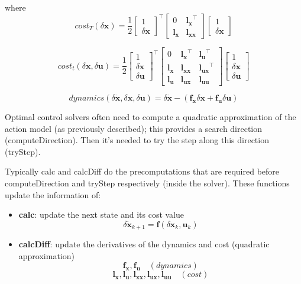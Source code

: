 where
$$cost_T(\delta\mathbf{x}) = \frac{1}{2}
\begin{bmatrix} 
  1 \\ \delta\mathbf{x}
\end{bmatrix}^\top
\begin{bmatrix}
0 & \mathbf{l_x}^\top \\
\mathbf{l_x} & \mathbf{l_{xx}}
\end{bmatrix}
\begin{bmatrix}
  1 \\ \delta\mathbf{x}
\end{bmatrix}
$$

$$cost_t(\delta\mathbf{x},\delta\mathbf{u}) = \frac{1}{2}
\begin{bmatrix} 
  1 \\ \delta\mathbf{x} \\ \delta\mathbf{u}
\end{bmatrix}^\top
\begin{bmatrix}
0 & \mathbf{l_x}^\top & \mathbf{l_u}^\top\\
\mathbf{l_x} & \mathbf{l_{xx}} & \mathbf{l_{ux}}^\top\\
\mathbf{l_u} & \mathbf{l_{ux}} & \mathbf{l_{uu}}
\end{bmatrix}
\begin{bmatrix}
  1 \\ \delta\mathbf{x} \\ \delta\mathbf{u}
\end{bmatrix}
$$

$$
dynamics(\delta\mathbf{\dot{x}},\delta\mathbf{x},\delta\mathbf{u}) = \delta\mathbf{\dot{x}} - (\mathbf{f_x}\delta\mathbf{x} + \mathbf{f_u}\delta\mathbf{u})
$$

Optimal control solvers often need to compute a quadratic approximation of the action model (as previously described); this provides a search direction (computeDirection). Then it's needed to try the step along this direction (tryStep).

Typically calc and calcDiff do the precomputations that are required before computeDirection and tryStep respectively (inside the solver). These functions update the information of:
\begin{itemize}
\item \textbf{calc}: update the next state and its cost value
 $$\delta\mathbf{\dot{x}}_{k+1} = \mathbf{f}(\delta\mathbf{x}_k,\mathbf{u}_k)$$
\item \textbf{calcDiff}: update the derivatives of the dynamics and cost (quadratic approximation)
 $$\mathbf{f_x}, \mathbf{f_u} \hspace{1em} (dynamics)$$
 $$\mathbf{l_x}, \mathbf{l_u}, \mathbf{l_{xx}}, \mathbf{l_{ux}}, \mathbf{l_{uu}} \hspace{1em} (cost)$$
\end{itemize}
 
